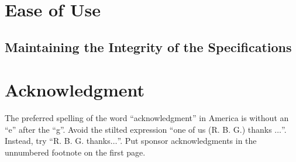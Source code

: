 \documentclass[conference]{IEEEtran}
\begin{document}
\section{Ease of Use}

\subsection{Maintaining the Integrity of the Specifications}

\section*{Acknowledgment}

The preferred spelling of the word ``acknowledgment'' in America is without 
an ``e'' after the ``g''. Avoid the stilted expression ``one of us (R. B. 
G.) thanks $\ldots$''. Instead, try ``R. B. G. thanks$\ldots$''. Put sponsor 
acknowledgments in the unnumbered footnote on the first page.

\nocite{*}



\vspace{12pt}
\end{document}
